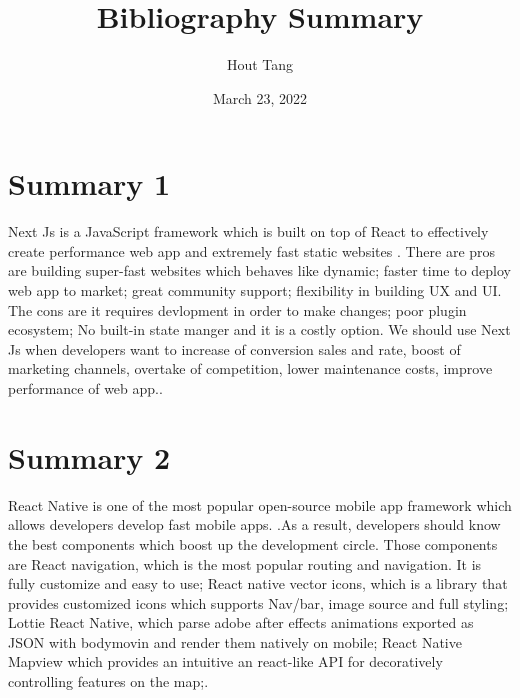 \documentclass{article}
\title{Bibliography Summary}
\author{Hout Tang}
\date{March 23, 2022}
\begin{document}
\maketitle

\section*{Summary 1}


Next Js is a JavaScript framework which is built on top of React to effectively create performance web app and extremely fast static websites \cite{TGArticle}. There are pros are building super-fast websites which behaves like dynamic; faster time to deploy web app to market; great community support;  flexibility in building UX and UI. The cons are it requires devlopment in order to make changes; poor plugin ecosystem; No built-in state manger and it is a costly option. We should use Next Js when developers want to increase of conversion sales and rate, boost of marketing channels, overtake of competition, lower maintenance costs, improve performance of web app.\cite{TGArticle}.


\medskip

\section*{Summary 2}

React Native is one of the most popular open-source mobile app framework which allows developers develop fast mobile apps. \cite{GKArticle}.As a result, developers should know the best components which boost up the development circle. Those components are React navigation, which is the most popular routing and navigation. It is fully customize and easy to use; React native vector icons, which is a library that provides customized icons which supports Nav/bar, image source and full styling; Lottie React Native, which parse adobe after effects animations exported as JSON with bodymovin and render them natively on mobile; React Native Mapview which provides an intuitive an react-like API for decoratively controlling features on the map;\cite{GKArticle}.



\printbibliography
\end{document}
